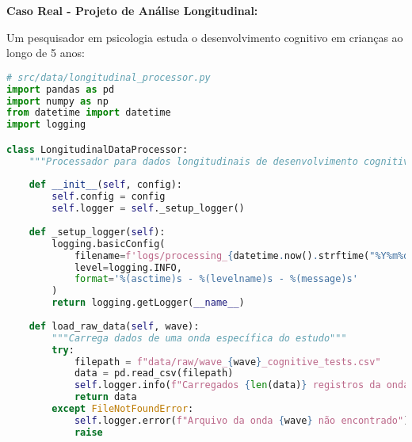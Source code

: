 \begin{researchbox}
\textbf{Caso Real - Projeto de Análise Longitudinal:}

Um pesquisador em psicologia estuda o desenvolvimento cognitivo em crianças ao longo de 5 anos:

\begin{lstlisting}[language=Python]
# src/data/longitudinal_processor.py
import pandas as pd
import numpy as np
from datetime import datetime
import logging

class LongitudinalDataProcessor:
    """Processador para dados longitudinais de desenvolvimento cognitivo"""
    
    def __init__(self, config):
        self.config = config
        self.logger = self._setup_logger()
        
    def _setup_logger(self):
        logging.basicConfig(
            filename=f'logs/processing_{datetime.now().strftime("%Y%m%d")}.log',
            level=logging.INFO,
            format='%(asctime)s - %(levelname)s - %(message)s'
        )
        return logging.getLogger(__name__)
    
    def load_raw_data(self, wave):
        """Carrega dados de uma onda específica do estudo"""
        try:
            filepath = f"data/raw/wave_{wave}_cognitive_tests.csv"
            data = pd.read_csv(filepath)
            self.logger.info(f"Carregados {len(data)} registros da onda {wave}")
            return data
        except FileNotFoundError:
            self.logger.error(f"Arquivo da onda {wave} não encontrado")
            raise
\end{lstlisting}
\end{researchbox}

\newpage

